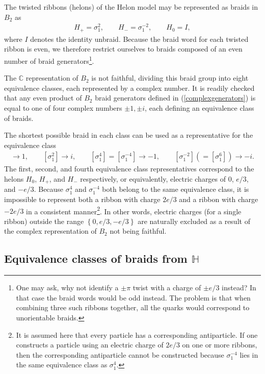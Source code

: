 \documentclass[a4paper]{jpconf}
\begin{document}
The twisted ribbons (helons) of the Helon model may be represented as braids in $B_2$ as 
\begin{eqnarray}
H_+=\sigma_1^2,\qquad H_-=\sigma_1^{-2},\qquad H_0=I,
\end{eqnarray} 
where $I$ denotes the identity unbraid. Because the braid word for each twisted ribbon is even, we therefore restrict ourselves to braids composed of an even number of braid generators\footnote{One may ask, why not identify a $\pm\pi$ twist with a charge of $\pm e/3$ instead? In that case the braid words would be odd instead. The problem is that when combining three such ribbons together, all the quarks would correspond to unorientable braids.}.

The $\mathbb{C}$ representation of $B_2$ is not faithful, dividing this braid group into eight equivalence classes, each represented by a complex number. It is readily checked that any even product of $B_2$ braid generators defined in (\ref{complexgenerators}) is equal to one of four complex numbers $\pm 1, \pm i$, each defining an equivalence class of braids.

The shortest possible braid in each class can be used as a representative for the equivalence class
\begin{eqnarray}
[I]\rightarrow 1,\qquad [\sigma_1^2]\rightarrow i,\qquad [\sigma_1^4]=[\sigma_1^{-4}]\rightarrow -1,\qquad [\sigma_1^{-2}](=[\sigma_1^{6}])\rightarrow -i.
\end{eqnarray}
The first, second, and fourth equivalence class representatives correspond to the helons $H_0$, $H_+$, and $H_-$ respectively, or equivalently, electric charges of $0$, $e/3$, and $-e/3$. Because $\sigma_1^4$ and $\sigma_1^{-4}$ both belong to the same equivalence class, it is impossible to represent both a ribbon with charge $2e/3$ and a ribbon with charge $-2e/3$ in a consistent manner\footnote{It is assumed here that every particle has a corresponding antiparticle. If one constructs a particle using an electric charge of $2e/3$ on one or more ribbons, then the corresponding antiparticle cannot be constructed because $\sigma_1^{-4}$ lies in the same equivalence class as $\sigma_1^4$.}. In other words, electric charges (for a single ribbon) outside the range $\left\lbrace 0, e/3,-e/3\right\rbrace $ are naturally excluded as a result of the complex representation of $B_2$ not being faithful.

\subsection{Equivalence classes of braids from $\mathbb{H}$}
\end{document}
